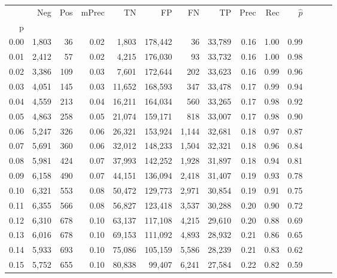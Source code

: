 \begin{tabular}{rrrrrrrrrrrrrr}
\toprule
{} &    Neg &  Pos & mPrec &       TN &       FP &      FN &      TP &  Prec &   Rec & $\hat{p}$ \\
p    &        &      &       &          &          &         &         &       &       &           \\
\midrule
0.00 &  1,803 &   36 &  0.02 &    1,803 &  178,442 &      36 &  33,789 &  0.16 &  1.00 &      0.99 \\
0.01 &  2,412 &   57 &  0.02 &    4,215 &  176,030 &      93 &  33,732 &  0.16 &  1.00 &      0.98 \\
0.02 &  3,386 &  109 &  0.03 &    7,601 &  172,644 &     202 &  33,623 &  0.16 &  0.99 &      0.96 \\
0.03 &  4,051 &  145 &  0.03 &   11,652 &  168,593 &     347 &  33,478 &  0.17 &  0.99 &      0.94 \\
0.04 &  4,559 &  213 &  0.04 &   16,211 &  164,034 &     560 &  33,265 &  0.17 &  0.98 &      0.92 \\
0.05 &  4,863 &  258 &  0.05 &   21,074 &  159,171 &     818 &  33,007 &  0.17 &  0.98 &      0.90 \\
0.06 &  5,247 &  326 &  0.06 &   26,321 &  153,924 &   1,144 &  32,681 &  0.18 &  0.97 &      0.87 \\
0.07 &  5,691 &  360 &  0.06 &   32,012 &  148,233 &   1,504 &  32,321 &  0.18 &  0.96 &      0.84 \\
0.08 &  5,981 &  424 &  0.07 &   37,993 &  142,252 &   1,928 &  31,897 &  0.18 &  0.94 &      0.81 \\
0.09 &  6,158 &  490 &  0.07 &   44,151 &  136,094 &   2,418 &  31,407 &  0.19 &  0.93 &      0.78 \\
0.10 &  6,321 &  553 &  0.08 &   50,472 &  129,773 &   2,971 &  30,854 &  0.19 &  0.91 &      0.75 \\
0.11 &  6,355 &  566 &  0.08 &   56,827 &  123,418 &   3,537 &  30,288 &  0.20 &  0.90 &      0.72 \\
0.12 &  6,310 &  678 &  0.10 &   63,137 &  117,108 &   4,215 &  29,610 &  0.20 &  0.88 &      0.69 \\
0.13 &  6,016 &  678 &  0.10 &   69,153 &  111,092 &   4,893 &  28,932 &  0.21 &  0.86 &      0.65 \\
0.14 &  5,933 &  693 &  0.10 &   75,086 &  105,159 &   5,586 &  28,239 &  0.21 &  0.83 &      0.62 \\
0.15 &  5,752 &  655 &  0.10 &   80,838 &   99,407 &   6,241 &  27,584 &  0.22 &  0.82 &      0.59 \\

\end{tabular}
